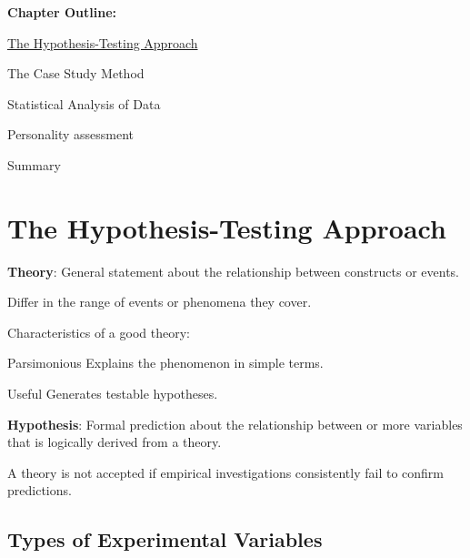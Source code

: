 \textbf{Chapter Outline:}
\begin{coloredlist}
    \item \hyperlink{hypothesis testing}{The Hypothesis-Testing Approach}
    \item The Case Study Method
    \item Statistical Analysis of Data
    \item Personality assessment
    \item Summary
\end{coloredlist}

\section{The Hypothesis-Testing Approach}\hypertarget{hypothesis testing}{}   
\begin{coloredlist}
    \item \textbf{Theory}: General statement about the relationship between constructs or events.
    \begin{coloredlist}
        \item Differ in the range of events or phenomena they cover.
    \end{coloredlist}
    \item Characteristics of a good theory:
    \begin{coloredlist}
        \item Parsimonious \textendash Explains the phenomenon in simple terms.
        \item Useful \textendash Generates testable hypotheses.
    \end{coloredlist}
    \item \textbf{Hypothesis}: Formal prediction about the relationship between or more variables that is logically derived from a theory.
    \item A theory is not accepted if empirical investigations consistently fail to confirm predictions.
\end{coloredlist}

\subsection{Types of Experimental Variables}

